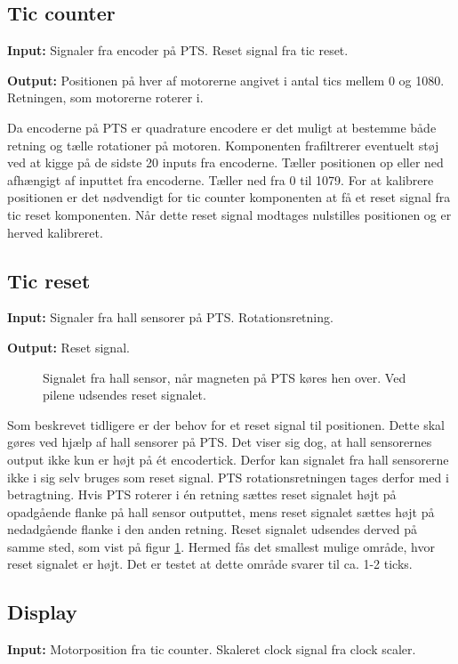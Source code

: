 \subsection*{Tic counter}
\textbf{Input:}
Signaler fra encoder på PTS. Reset signal fra tic reset.

\textbf{Output:} Positionen på hver af motorerne angivet i antal tics mellem 0 
og 1080. Retningen, som motorerne roterer i. 

Da encoderne på PTS er quadrature encodere er det muligt at bestemme både retning og 
tælle rotationer på motoren.
Komponenten frafiltrerer eventuelt støj ved at kigge på de sidste 20 inputs fra encoderne.
Tæller positionen op eller ned afhængigt af inputtet fra encoderne. 
Tæller ned fra 0 til 1079.
For at kalibrere positionen er det nødvendigt for tic counter komponenten at få 
et reset signal fra tic reset komponenten. 
Når dette reset signal modtages nulstilles positionen og er herved kalibreret.

\subsection*{Tic reset}
\textbf{Input:} Signaler fra hall sensorer på PTS. Rotationsretning.

\textbf{Output:} Reset signal.

\begin{figure}[!th]
\centering

\caption[Signal fra hall sensor]{Signalet fra hall sensor, når magneten på PTS køres hen over. Ved pilene udsendes reset signalet.}
\label{fig:hall_sensor_signal}
\end{figure}

Som beskrevet tidligere er der behov for et reset signal til positionen. 
Dette skal gøres ved hjælp af hall sensorer på PTS. 
Det viser sig dog, at hall sensorernes output ikke kun er højt på ét encodertick. 
Derfor kan signalet fra hall sensorerne ikke i sig selv bruges som reset signal.
PTS rotationsretningen tages derfor med i betragtning.
Hvis PTS roterer i én retning sættes reset signalet højt på opadgående 
flanke på hall sensor outputtet, mens reset signalet sættes højt på nedadgående 
flanke i den anden retning. Reset signalet udsendes derved på samme sted, som vist på figur \ref{fig:hall_sensor_signal}.
Hermed fås det smallest mulige område, hvor reset signalet er højt.
Det er testet at dette område svarer til ca. 1-2 ticks.

\subsection*{Display}
\textbf{Input:} Motorposition fra tic counter. Skaleret clock signal fra clock 
scaler.

